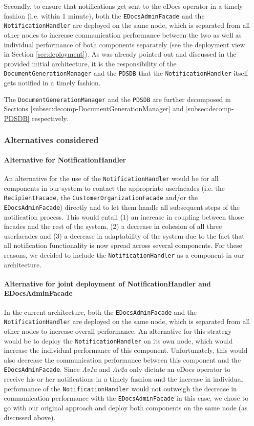 \documentclass[a4paper,10pt]{article}
\begin{document}
Secondly, to ensure that notifications get sent to the eDocs operator in a timely fashion (i.e. within 1 minute), both the \texttt{EDocsAdminFacade} and the \texttt{NotificationHandler} are deployed on the same node, which is separated from all other nodes to increase communication performance between the two as well as individual performance of both components separately (see the deployment view in Section \ref{sec:deployment}). As was already pointed out and discussed in the provided initial architecture, it is the responsibility of the \texttt{DocumentGenerationManager} and the \texttt{PDSDB} that the \texttt{NotificationHandler} itself gets notified in a timely fashion.

The \texttt{DocumentGenerationManager} and the \texttt{PDSDB} are further decomposed in Sections \ref{subsec:decomp-DocumentGenerationManager} and \ref{subsec:decomp-PDSDB} respectively.
\subsubsection*{Alternatives considered}
\paragraph{Alternative for NotificationHandler}
An alternative for the use of the \texttt{NotificationHandler} would be for all components in our system to contact the appropriate userfacades (i.e. the \texttt{RecipientFacade}, the \texttt{CustomerOrganizationFacade} and/or the \texttt{EDocsAdminFacade}) directly and to let them handle all subsequent steps of the notification process. This would entail (1) an increase in coupling between those facades and the rest of the system, (2) a decrease in cohesion of all three userfacades and (3) a decrease in adaptability of the system due to the fact that all notification functionality is now spread across several components. For these reasons, we decided to include the \texttt{NotificationHandler} as a component in our architecture.
\paragraph{Alternative for joint deployment of NotificationHandler and EDocsAdminFacade}
In the current architecture, both the \texttt{EDocsAdminFacade} and the \texttt{NotificationHandler} are deployed on the same node, which is separated from all other nodes to increase overall performance. An alternative for this strategy would be to deploy the \texttt{NotificationHandler} on its own node, which would increase the individual performance of this component. Unfortunately, this would also decrease the communication performance between this component and the \texttt{EDocsAdminFacade}. Since \textit{Av1a} and \textit{Av2a} only dictate an eDocs operator to receive his or her notifications in a timely fashion and the increase in individual performance of the \texttt{NotificationHandler} would not outweigh the decrease in communication performance with the \texttt{EDocsAdminFacade} in this case, we chose to go with our original approach and deploy both components on the same node (as discussed above).
\end{document}
